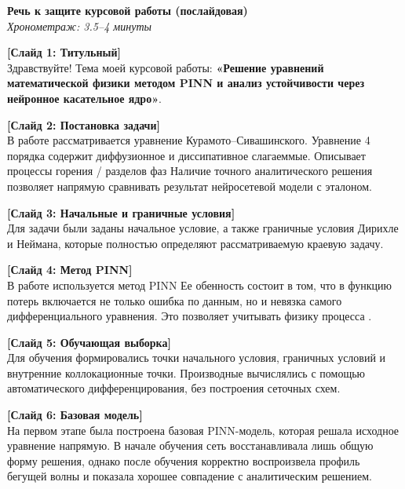 \documentclass[a4paper,14pt]{extarticle}
\begin{document}
\begin{center}
    \textbf{\Large Речь к защите курсовой работы (послайдовая)} \\
    \textit{Хронометраж: 3.5--4 минуты}
\end{center}

\vspace{1em}

\noindent \textbf{[Слайд 1: Титульный]} \\
Здравствуйте! Тема моей курсовой работы: \textbf{«Решение уравнений математической физики методом PINN и анализ устойчивости через нейронное касательное ядро»}. 
\vspace{0.8em}

\noindent \textbf{[Слайд 2: Постановка задачи]} \\
В работе рассматривается уравнение Курамото--Сивашинского. Уравнение 4 порядка содержит диффузионное и диссипативное  слагаеммые. Описывает процессы горения / разделов фаз Наличие точного аналитического решения позволяет напрямую сравнивать результат нейросетевой модели с эталоном.

\vspace{0.8em}

\noindent \textbf{[Слайд 3: Начальные и граничные условия]} \\
Для задачи были заданы начальное условие, а также граничные условия Дирихле и Неймана, которые полностью определяют рассматриваемую краевую задачу.

\vspace{0.8em}

\noindent \textbf{[Слайд 4: Метод PINN]} \\
В работе используется метод PINN    Ее обенность состоит в том, что в функцию потерь включается не только ошибка по данным, но и невязка самого дифференциального уравнения. Это позволяет учитывать физику процесса .

\vspace{0.8em}

\noindent \textbf{[Слайд 5: Обучающая выборка]} \\
Для обучения формировались точки начального условия, граничных условий и внутренние коллокационные точки. Производные вычислялись с помощью автоматического дифференцирования, без построения сеточных схем.

\vspace{0.8em}

\noindent \textbf{[Слайд 6: Базовая модель]} \\
На первом этапе была построена базовая PINN-модель, которая решала исходное уравнение напрямую. В начале обучения сеть восстанавливала лишь общую форму решения, однако после обучения корректно воспроизвела профиль бегущей волны и показала хорошее совпадение с аналитическим решением.
\end{document}
